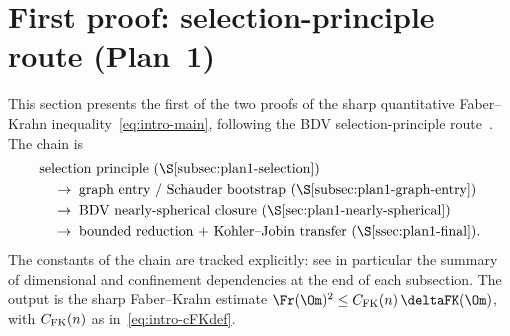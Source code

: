 %

\section{First proof: selection-principle route (Plan~1)}
\label{sec:plan1}

This section presents the first of the two proofs of the sharp
quantitative Faber--Krahn inequality~\eqref{eq:intro-main}, following
the BDV selection-principle route~\cite{BDV}. The chain is
\[
   \begin{aligned}
   &\text{selection principle (\S\ref{subsec:plan1-selection})}\\
   &\quad\to\;\text{graph entry / Schauder bootstrap (\S\ref{subsec:plan1-graph-entry})}\\
   &\quad\to\;\text{BDV nearly-spherical closure (\S\ref{sec:plan1-nearly-spherical})}\\
   &\quad\to\;\text{bounded reduction + Kohler--Jobin transfer (\S\ref{ssec:plan1-final})}.
   \end{aligned}
\]
The constants of the chain are tracked explicitly: see in particular
the summary of dimensional and confinement dependencies at the end of
each subsection. The output is the sharp Faber--Krahn estimate
$\Fr(\Om)^2\le C_{\rm FK}(n)\,\deltaFK(\Om)$, with $C_{\rm FK}(n)$ as
in~\eqref{eq:intro-cFKdef}.




\label{subsec:plan1-ns}%


